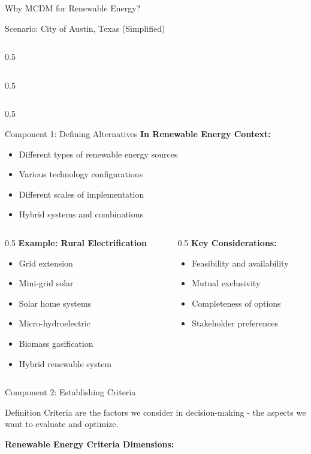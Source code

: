 \documentclass[aspectratio=169]{beamer}
\begin{document}
\begin{frame}{Why MCDM for Renewable Energy?}
\begin{center}
\begin{block}{Scenario: City of Austin, Texas (Simplified)}
\begin{column}{0.5\textwidth}
\begin{itemize}
\begin{column}{0.5\textwidth}
\begin{itemize}
\begin{columns}
\begin{column}{0.5\textwidth}
\begin{center}
\begin{frame}{Component 1: Defining Alternatives}
\textbf{In Renewable Energy Context:}
\begin{itemize}
\item Different types of renewable energy sources
\item Various technology configurations
\item Different scales of implementation
\item Hybrid systems and combinations
\end{itemize}

\vspace{0.3cm}
\begin{columns}
\begin{column}{0.5\textwidth}
\textbf{Example: Rural Electrification}
\begin{itemize}
\item Grid extension
\item Mini-grid solar
\item Solar home systems
\item Micro-hydroelectric
\item Biomass gasification
\item Hybrid renewable system
\end{itemize}
\end{column}
\begin{column}{0.5\textwidth}
\textbf{Key Considerations:}
\begin{itemize}
\item Feasibility and availability
\item Mutual exclusivity
\item Completeness of options
\item Stakeholder preferences
\end{itemize}
\end{column}
\end{columns}
\end{frame}

\begin{frame}{Component 2: Establishing Criteria}
\begin{block}{Definition}
Criteria are the factors we consider in decision-making - the aspects we want to evaluate and optimize.
\end{block}

\textbf{Renewable Energy Criteria Dimensions:}


\end{frame}
\end{center}
\end{column}
\end{columns}
\end{itemize}
\end{column}
\end{itemize}
\end{column}
\end{block}
\end{center}
\end{frame}
\end{document}
